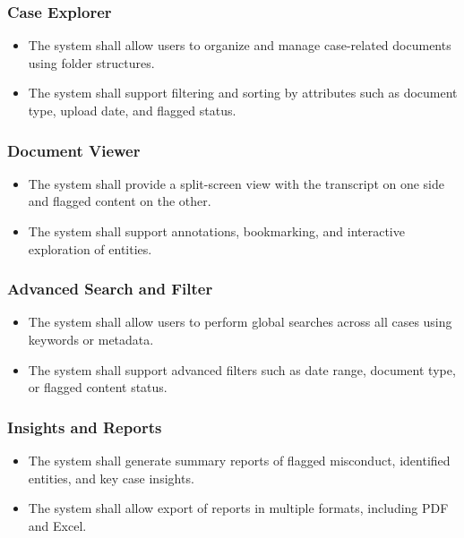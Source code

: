 \documentclass[12pt]{article}
\begin{document}
\subsubsection{Case Explorer}
\begin{itemize}
  \item   The system shall allow users to organize and manage case-related documents using folder
 structures.
  \item  The system shall support filtering and sorting by attributes such as document type, upload
 date, and flagged status.
\end{itemize}

\subsubsection{Document Viewer}
\begin{itemize}
  \item    The system shall provide a split-screen view with the transcript on one side and flagged
 content on the other.
  \item   The system shall support annotations, bookmarking, and interactive exploration of entities.
\end{itemize}

\subsubsection{ Advanced Search and Filter}
\begin{itemize}
  \item   The system shall allow users to perform global searches across all cases using keywords or
 metadata.

  \item   The system shall support advanced filters such as date range, document type, or flagged
 content status.
\end{itemize}


\subsubsection{ Insights and Reports}
\begin{itemize}
  \item    The system shall generate summary reports of flagged misconduct, identified entities, and
 key case insights.
  \item  The system shall allow export of reports in multiple formats, including PDF and Excel.
\end{itemize}
\end{document}

